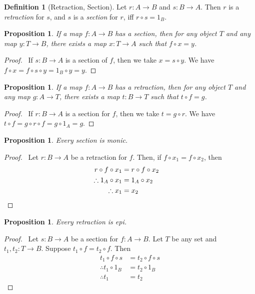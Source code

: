 \documentclass{article}
\let\qed\relax
\newtheorem{proposition}[axiom]{Proposition}
\theoremstyle{definition}
\newtheorem{definition}[axiom]{Definition}
\begin{document}
\begin{definition}[Retraction, Section]
    Let $r : A \rightarrow B$ and $s : B \rightarrow A$. Then $r$ is a \emph{retraction} for $s$, and $s$ is a
    \emph{section} for $r$, iff $r \circ s = 1_B$.
\end{definition}

\begin{proposition}
    If a map $f : A \rightarrow B$ has a section, then for any object $T$ and any map $y : T \rightarrow B$,
    there exists a map $x : T \rightarrow A$ such that $f \circ x = y$.
\end{proposition}

\begin{proof}
    \pf\ If $s : B \rightarrow A$ is a section of $f$, then we take $x = s \circ y$. We have
    $f \circ x = f \circ s \circ y = 1_B \circ y = y$. \qed
\end{proof}

\begin{proposition}
    If a map $f : A \rightarrow B$ has a retraction, then for any object $T$ and any map $g : A \rightarrow T$,
    there exists a map $t : B \rightarrow T$ such that $t \circ f = g$.
\end{proposition}

\begin{proof}
    \pf\ If $r : B \rightarrow A$ is a section for $f$, then we take $t = g \circ r$. We have
    $t \circ f = g \circ r \circ f = g \circ 1_A = g$. \qed
\end{proof}

\begin{proposition}
    Every section is monic.
\end{proposition}

\begin{proof}
    \pf\ Let $r : B \rightarrow A$ be a retraction for $f$. Then, if $f \circ x_1 = f \circ x_2$, then
    \begin{align*}
        r \circ f \circ x_1 & = r \circ f \circ x_2 \\
        \therefore 1_A \circ x_1 & = 1_A \circ x_2 \\
        \therefore x_1 & = x_2 & \qed
    \end{align*}
\end{proof}

\begin{proposition}
    Every retraction is epi.
\end{proposition}

\begin{proof}
    \pf\     Let $s : B \rightarrow A$ be a section for $f : A \rightarrow B$. Let $T$ be any set and $t_1, t_2 : T \rightarrow B$.
    Suppose $t_1 \circ f = t_2 \circ f$. Then
    \begin{align*}
        t_1 \circ f \circ s & = t_2 \circ f \circ s \\
        \therefore t_1 \circ 1_B & = t_2 \circ 1_B \\
        \therefore t_1 & = t_2
    \end{align*}
\end{proof}
\end{document}
